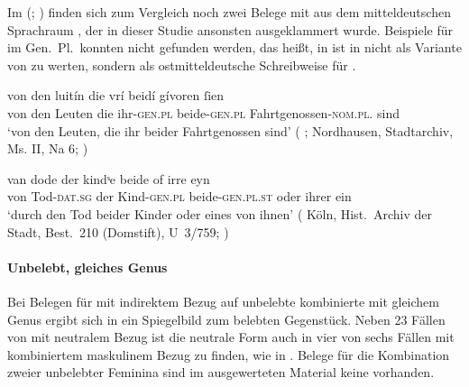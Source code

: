Im  (\REM; \nosh\cite{rem}) finden sich
zum Vergleich noch zwei Belege mit  aus dem
mitteldeutschen Sprachraum
, der in dieser Studie ansonsten ausgeklammert wurde.
Beispiele für  im Gen.\ Pl.\ konnten nicht gefunden werden, das
heißt,  in  ist in  nicht als Variante
von  zu werten, sondern als ostmitteldeutsche
Schreibweise für  \autocites[52--53]{paul2007}[305]{ksw2}.

\begin{exe}
\ex \label{ex:remgenbeide}
\begin{xlist}
	\ex \label{ex:remgenbeide_1}
		\gll von den luitín die vrí beidí gívoren ſien \\
			von den Leuten die ihr-\textsc{gen.pl} beide-\textsc{gen.pl}
				Fahrtgenossen-\textsc{nom.pl.\MascA} sind \\
		\trans `von den Leuten, die ihr beider Fahrtgenossen sind'
			(%
				;
				Nordhausen, Stadtarchiv, Ms. II, Na 6;
				\cite[M320: 17v,21--22]{rem}%
			)

	\ex \label{ex:remgenbeide_2}
		\gll van dode der kindˢe beide of irre eyn \\
			von Tod-\textsc{dat.sg} der Kind-\textsc{gen.pl}
				beide-\textsc{gen.pl.st} oder ihrer ein \\
		\trans `durch den Tod beider Kinder oder eines von ihnen'
			(%
				Köln, Hist.~Archiv der Stadt, Best.~210
				\mkbibparens{Domstift}, U~3/759;
				\cite[M350: 5,11]{rem}%
			)
\end{xlist}
\end{exe}

\paragraph{Unbelebt, gleiches Genus}

Bei Belegen für  mit indirektem Bezug auf unbelebte kombinierte
 mit gleichem Genus ergibt sich in
 ein Spiegelbild zum belebten Gegenstück. Neben 23
Fällen von  mit neutralem Bezug ist die neutrale Form auch in vier
von sechs Fällen mit kombiniertem maskulinem Bezug zu finden, wie in
. Belege für die Kombination zweier
unbelebter Feminina sind im ausgewerteten Material keine vorhanden.

